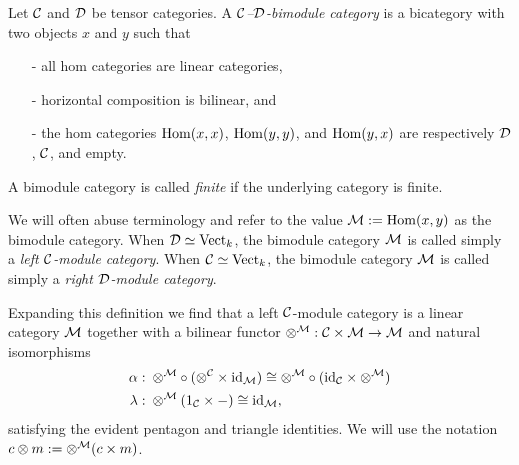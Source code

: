 \documentclass{amsart}
\begin{document}
\begin{definition}
	Let $\mathcal C$ and $\mathcal D$ be tensor categories. A {\em $\mathcal C$--$\mathcal D$-bimodule category} is a bicategory with two objects $x$ and $y$ such that 
	\begin{itemize}
		\item[-] all hom categories are linear categories, 
		\item[-] horizontal composition is bilinear, and
		\item[-] the hom categories $\operatorname{Hom}(x,x)$, $\operatorname{Hom}(y,y)$, and $\operatorname{Hom}(y,x)$ are respectively $\mathcal D$, $\mathcal C$, and empty.   
	\end{itemize}
	A bimodule category is called {\em finite} if the underlying category is finite.  
	
	We will often abuse terminology and refer to the value $\mathcal M := \operatorname{Hom}(x,y)$ as the bimodule category. When $\mathcal D \simeq \mathrm{Vect}_k$, the bimodule category $\mathcal M$ is called simply a {\em left $\mathcal C$-module category}. When $\mathcal C \simeq \mathrm{Vect}_k$, the bimodule category $\mathcal M$ is called simply a {\em right $\mathcal D$-module category}.
	
\end{definition}

	
Expanding this definition we find that a left $\mathcal C$-module category is a linear category $\mathcal M$ together with a bilinear functor $\otimes^{\mathcal M}: \mathcal C \times \mathcal M \to \mathcal M$ and natural isomorphisms
	\begin{align*}
		\alpha: & \;    \otimes^{\mathcal M} \circ \: (\otimes^{\mathcal C} \times \mathrm{id}_{\mathcal M}) \cong  \otimes^{\mathcal M} \circ (\mathrm{id}_{\mathcal C} \times \otimes^{\mathcal M}) \\
		\lambda: & \; \otimes^{\mathcal M}(1_{\mathcal C} \times -) \cong \mathrm{id}_{\mathcal M},
	\end{align*}
	satisfying the evident pentagon and triangle identities.  We will use the notation $c \otimes m := \otimes^\mathcal M(c \times m)$.
\end{document}

